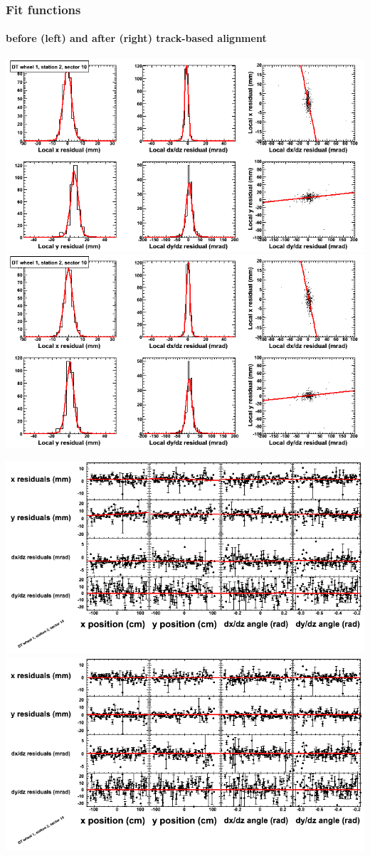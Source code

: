 \documentclass[compress]{beamer}
\begin{document}
\begin{frame}
\frametitle{Fit functions}
\framesubtitle{before (left) and after (right) track-based alignment}
\includegraphics[width=0.5\linewidth]{fitfunctions_re01/MBwhDst2sec10_bellcurves.png} \includegraphics[width=0.5\linewidth]{fitfunctions_re05/MBwhDst2sec10_bellcurves.png}

\includegraphics[width=0.5\linewidth]{fitfunctions_re01/MBwhDst2sec10_polynomials.png} \includegraphics[width=0.5\linewidth]{fitfunctions_re05/MBwhDst2sec10_polynomials.png}
\end{frame}
\end{document}
